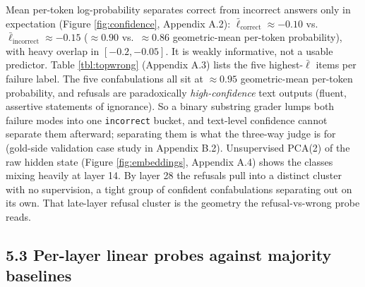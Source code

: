 Mean per-token log-probability separates correct from incorrect answers
only in expectation (Figure \ref{fig:confidence}, Appendix A.2):
\(\bar{\ell}_{\mathrm{correct}} \approx -0.10\)
vs.~\(\bar{\ell}_{\mathrm{incorrect}} \approx -0.15\) (\(\approx 0.90\)
vs.~\(\approx 0.86\) geometric-mean per-token probability), with heavy
overlap in \([-0.2, -0.05]\). It is weakly informative, not a usable
predictor. Table \ref{tbl:topwrong} (Appendix A.3) lists the five
highest-\(\bar\ell\) items per failure label. The five confabulations
all sit at \(\approx 0.95\) geometric-mean per-token probability, and
refusals are paradoxically \emph{high-confidence} text outputs (fluent,
assertive statements of ignorance). So a binary substring grader lumps
both failure modes into one \texttt{incorrect} bucket, and text-level
confidence cannot separate them afterward; separating them is what the
three-way judge is for (gold-side validation case study in Appendix
B.2). Unsupervised PCA(2) of the raw hidden state (Figure
\ref{fig:embeddings}, Appendix A.4) shows the classes mixing heavily at
layer 14. By layer 28 the refusals pull into a distinct cluster with no
supervision, a tight group of confident confabulations separating out on
its own. That late-layer refusal cluster is the geometry the
refusal-vs-wrong probe reads.

\subsection{5.3 Per-layer linear probes against majority
baselines}\label{per-layer-linear-probes-against-majority-baselines}

